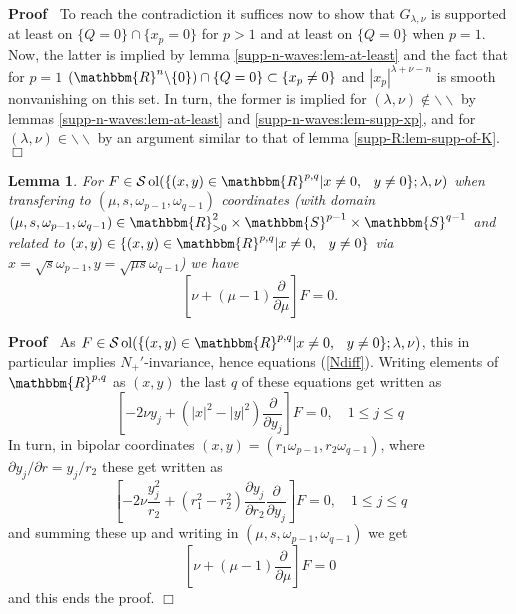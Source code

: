 \documentclass[12pt]{article}
\newcommand{\nin}{\not\in}
\newcommand{\tmop}[1]{\ensuremath{\operatorname{#1}}}
\renewenvironment{proof}{\noindent\textbf{Proof\ }}{\hspace*{\fill}$\Box$\medskip}
\newtheorem{lemma}[proposition]{Lemma}
\theoremstyle{remark}
\newcommand{\R}{\mathbbm{R}}
\newcommand{\mysbra}[1]{\left[ #1 \right]}
\begin{document}
\begin{proof}
  To reach the contradiction it suffices now to show that $G_{\lambda, \nu}$
  is supported at least on $\{ Q = 0 \} \cap \{ x_p = 0 \}$ for $p > 1$ and at
  least on $\{ Q = 0 \}$ when $p = 1$. Now, the latter is implied by lemma
  \ref{supp-n-waves:lem-at-least} and the fact that for $p = 1$
  $(\mathbbm{R}^n \backslash \{ 0 \}) \cap \{ Q = 0 \} \subset \{ x_p \neq 0
  \}$ and $| x_p |^{\lambda + \nu - n}$ is smooth nonvanishing on this set. In
  turn, the former is implied for $(\lambda, \nu) \nin \backslash\backslash$
  by lemmas \ref{supp-n-waves:lem-at-least} and
  \ref{supp-n-waves:lem-supp-xp}, and for $(\lambda, \nu) \in
  \backslash\backslash$ by an argument similar to that of lemma
  \ref{supp-R:lem-supp-of-K}.
\end{proof}

\begin{lemma}
  \label{supp-Q:lem-operator}For $F \in \mathcal{S} \tmop{ol} (\{ (x, y) \in
  \R^{p, q} |x \neq 0, \hspace{0.75em} y \neq 0\}; \lambda, \nu)$ when
  transfering to $(\mu, s, \omega_{p - 1}, \omega_{q - 1})$ coordinates (with
  domain $(\mu, s, \omega_{p - 1}, \omega_{q - 1}) \in \mathbbm{R}_{> 0}^2
  \times \mathbbm{S}^{p - 1} \times \mathbbm{S}^{q - 1}$ and related to $(x,
  y) \in \{ (x, y) \in \R^{p, q} |x \neq 0, \hspace{0.75em} y \neq 0\}$ via $x
  = \sqrt{s} \omega_{p - 1}, y = \sqrt{\mu s} \omega_{q - 1}$) we have
  \[ \mysbra{\nu + (\mu - 1)  \frac{\partial}{\partial \mu}} F = 0. \]
\end{lemma}

\begin{proof}
  As $F \in \mathcal{S} \tmop{ol} (\{ (x, y) \in \R^{p, q} |x \neq 0,
  \hspace{0.75em} y \neq 0\}; \lambda, \nu)$, this in particular implies
  $N_+'$-invariance, hence equations (\ref{Ndiff}). Writing elements of
  $\R^{p, q}$ as $(x, y)$ the last $q$ of these equations get written as
  \[ \left[ - 2 \nu y_j + (| x |^2 - | y |^2) \frac{\partial}{\partial y_j}
     \right] F = 0, \quad 1 \leq j \leq q \]
  In turn, in bipolar coordinates $(x, y) = (r_1 \omega_{p - 1}, r_2 \omega_{q
  - 1})$, where $\partial y_j / \partial r = y_j / r_2$ these get written as
  \[ \mysbra{- 2 \nu \frac{y_j^2}{r_2} + (r_1^2 - r_2^2)  \frac{\partial
     y_j}{\partial r_2}  \frac{\partial}{\partial y_j}} F = 0, \quad 1 \leq j
     \leq q \]
  and summing these up and writing in $(\mu, s, \omega_{p - 1}, \omega_{q -
  1})$ we get
  \[ \mysbra{\nu + (\mu - 1)  \frac{\partial}{\partial \mu}} F = 0 \]
  and this ends the proof.
\end{proof}
\end{document}
